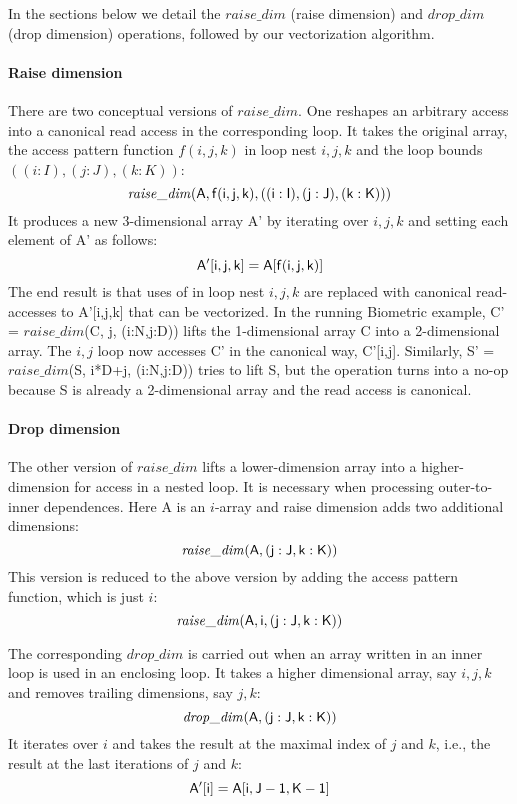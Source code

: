 In the sections below we detail the $\mathit{raise\_dim}$ (raise dimension) and $\mathit{drop\_dim}$ (drop dimension) operations,
followed by our vectorization algorithm.


\paragraph{Raise dimension} 
There are two conceptual versions of $\mathit{raise\_dim}$. One reshapes an arbitrary access into a canonical read access in the corresponding loop. 
It takes the original array, the access pattern function $f(i,j,k)$ in loop nest $i,j,k$ and the loop bounds
$((i:I),(j:J),(k:K))$:
\[ \mathit{raise\_dim}({\sf A, f(i,j,k), ((i:I),(j:J),(k:K))}) \]
It produces a new 3-dimensional array {\sf A'} by iterating over $i,j,k$ and setting each element of  {\sf A'} as follows:
\[ {\sf A'[i,j,k] =  A[f(i,j,k)]} \]
The end result is that uses of {\sf [A[f(i,j,k)]} in loop nest $i,j,k$ are replaced with canonical read-accesses to {\sf A'[i,j,k]}
that can be vectorized. In the running Biometric example, {\sf C'} = $\mathit{raise\_dim}${\sf (C, j, (i:N,j:D))} lifts the
1-dimensional array {\sf C} into a 2-dimensional array. The $i,j$ loop now accesses {\sf C'} in the canonical way, {\sf C'[i,j]}.
Similarly, {\sf S'} = $\mathit{raise\_dim}${\sf (S, i*D+j, (i:N,j:D))} tries to lift {\sf S}, but the operation turns into a no-op
because {\sf S} is already a 2-dimensional array and the read access is canonical.

\paragraph{Drop dimension} 
The other version of $\mathit{raise\_dim}$ lifts a lower-dimension array into a
higher-dimension for access in a nested loop. It is necessary when processing outer-to-inner dependences. 
Here {\sf A} is an $i$-array and raise dimension adds two additional dimensions:
\[ \mathit{raise\_dim}({\sf A}, {\sf (j:J,k:K)}) \]
This version is reduced to the above version by adding the access pattern function, which is just $i$:
\[ \mathit{raise\_dim}({\sf A, i, (j:J,k:K)}) \]

The corresponding $\mathit{drop\_dim}$ is carried out when an array written in an inner loop is used in an enclosing loop.
It takes a higher dimensional array, say $i,j,k$ and removes trailing dimensions, say $j,k$:
\[ \mathit{drop\_dim}({\sf A, (j:J,k:K)}) \]
It iterates over $i$ and takes the result at the maximal index of $j$ and $k$, i.e., the result at the last iterations of $j$ and $k$:
\[ {\sf A'[i] = A[i,J-1,K-1]} \]


